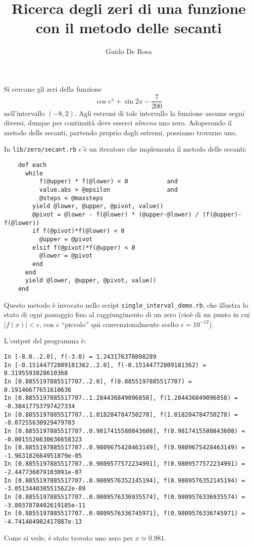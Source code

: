 \documentclass[a4paper]{article}
\author{Guido De Rosa}
\begin{document}
\title{Ricerca degli zeri di una funzione con il metodo delle secanti}

\maketitle


Si cercano gli zeri della funzione
\[
  \cos{e^{x}} + \sin{2x} - \frac{7}{200} 
\]
nell'intervallo $(-8, 2)$. Agli estremi di tale intervallo la funzione
assume segni diversi, dunque per continuità deve esserci \emph{almeno}
uno zero. Adoperando il metodo delle secanti, partendo proprio dagli estremi,
possiamo trovarne uno. 

In \texttt{lib/zero/secant.rb} c'è un iteratore che implementa il metodo 
delle secanti:
\begin{lstlisting}
    def each
      while
          f(@upper) * f(@lower) < 0           and
          value.abs > @epsilon                and
          @steps < @maxsteps
        yield @lower, @upper, @pivot, value()
        @pivot = @lower - f(@lower) * (@upper-@lower) / (f(@upper)-f(@lower))
        if f(@pivot)*f(@lower) < 0
          @upper = @pivot
        elsif f(@pivot)*f(@upper) < 0
          @lower = @pivot
        end
      end
      yield @lower, @upper, @pivot, value()
    end
\end{lstlisting}

Questo metodo è invocato nello script \texttt{single\_interval\_demo.rb},
che illustra lo stato di ogni passaggio fino al raggiungimento di un zero
(cioè di un punto in cui $|f(x)| < \epsilon$, con $\epsilon$ ``piccolo''
qui convenzionalmente scelto $\epsilon = 10^{-12}$).

L'output del programma è:
\begin{lstlisting}
In [-8.0..2.0], f(-3.0) = 1.243176378098289
In [-0.15144772809181362..2.0], f(-0.15144772809181362) = 0.3195593828610368
In [0.8855197885517707..2.0], f(0.8855197885517707) = 0.19146677651610636
In [0.8855197885517707..1.284436849096858], f(1.284436849096858) = -0.38417753797427334
In [0.8855197885517707..1.018204784750278], f(1.018204784750278) = -0.07255630929479703
In [0.8855197885517707..0.9817415580843608], f(0.9817415580843608) = -0.0015526630636658323
In [0.8855197885517707..0.9809675428463149], f(0.9809675428463149) = -1.963182664951879e-05
In [0.8855197885517707..0.9809577572234991], f(0.9809577572234991) = -2.447736079103091e-07
In [0.8855197885517707..0.9809576352145194], f(0.9809576352145194) = -3.0513440385515622e-09
In [0.8855197885517707..0.9809576336935574], f(0.9809576336935574) = -3.8037878402619185e-11
In [0.8855197885517707..0.9809576336745971], f(0.9809576336745971) = -4.741484982417887e-13
\end{lstlisting}
Come si vede, è stato trovato uno zero per $x \simeq 0.981$.
\end{document}
